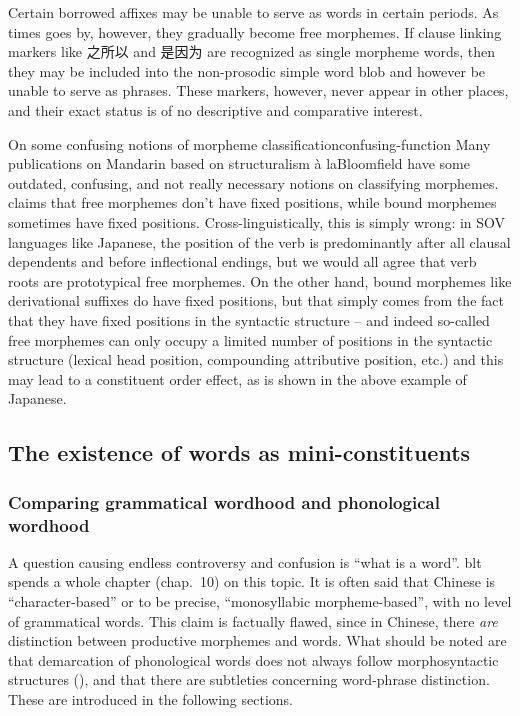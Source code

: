 \documentclass[UTF8, a4paper, oneside, scheme=plain]{ctexrep}
\newcommand*{\citechap}[1]{chap.~{#1}}
\newcommand*{\citepage}[1]{p.~{#1}}
\newcommand*{\term}[1]{\emph{#1}}
\newcommand{\ala}{à la}
\begin{document}
Certain borrowed affixes may be unable to serve as words in certain periods.
As times goes by, however, they gradually become free morphemes.
If clause linking markers like 之所以 and 是因为 are recognized as single morpheme words,
then they may be included into the non-prosodic simple word blob 
and however be unable to serve as phrases.
These markers, however, never appear in other places,
and their exact status is of no descriptive and comparative interest.

\begin{infobox}{On some confusing notions of morpheme classification}{confusing-function}
    Many publications on Mandarin based on structuralism \ala Bloomfield 
    have some outdated, confusing, and not really necessary 
    notions on classifying morphemes.
    \citet[\citepage{16}]{zhudexigrammar} claims that 
    free morphemes don't have fixed positions, 
    while bound morphemes sometimes have fixed positions.
    Cross-linguistically, this is simply wrong: 
    in SOV languages like Japanese, 
    the position of the verb is predominantly 
    after all clausal dependents and before inflectional endings, 
    but we would all agree that verb roots are prototypical free morphemes.
    On the other hand, 
    bound morphemes like derivational suffixes 
    do have fixed positions, 
    but that simply comes from the fact that 
    they have fixed positions in the syntactic structure -- 
    and indeed so-called free morphemes can only occupy a limited number 
    of positions in the syntactic structure 
    (lexical head position, compounding attributive position, etc.)
    and this may lead to a constituent order effect, 
    as is shown in the above example of Japanese.
\end{infobox}

\subsection{The existence of words as mini-constituents}\label{sec:pos.word}

\subsubsection{Comparing grammatical wordhood and phonological wordhood}\label{sec:pos.word.phonological}

A question causing endless controversy and confusion 
is ``what is a word''. 
\ac{blt} spends a whole chapter (\citechap{10}) on this topic.
It is often said that Chinese is ``character-based''
or to be precise, ``monosyllabic morpheme-based'',
with no level of grammatical words.
This claim is factually flawed, 
since in Chinese, there \term{are} distinction between 
productive morphemes and words.
What should be noted are
that demarcation of phonological words does not always follow morphosyntactic structures
(),
and that there are subtleties concerning word-phrase distinction. 
These are introduced in the following sections.
\end{document}
